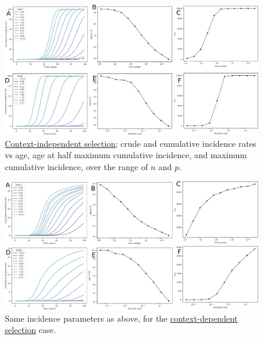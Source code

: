 \documentclass[a0,landscape]{a0poster}
\begin{document}
\begin{multicols}{3}
		\vspace{0.5cm}
			\begin{figure}[H]
			\centering
				\includegraphics[width=.8\linewidth, keepaspectratio=true]{fig5.png}
				\caption{\underline{Context-independent selection}; crude and cumulative incidence rates vs age, age at half maximum cumulative incidence, and maximum cumulative incidence, over the range of $n$ and $p$.}
			\end{figure}
			\begin{figure}[H]
			\centering
				\includegraphics[width=.8\linewidth, keepaspectratio=true]{fig6.png}
				\caption{Same incidence parameters as above, for the \underline{context-dependent selection} case.}
			\end{figure}
		

\end{multicols}
\end{document}
